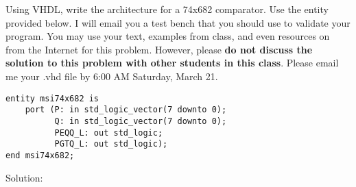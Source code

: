 Using VHDL, write the architecture for a 74x682 comparator.  Use the entity provided below.  I will email you a test bench that you should use to validate your program.  You may use your text, examples from class, and even resources on from the Internet for this problem.  However, please \textbf{do not discuss the solution to this problem with other students in this class}.  Please email me your .vhd file by 6:00 AM Saturday, March 21.
\lstset{language=VHDL}
\begin{lstlisting}
entity msi74x682 is
    port (P: in std_logic_vector(7 downto 0);
          Q: in std_logic_vector(7 downto 0);
          PEQQ_L: out std_logic;
          PGTQ_L: out std_logic);
end msi74x682;
\end{lstlisting}

Solution: \\ \\

